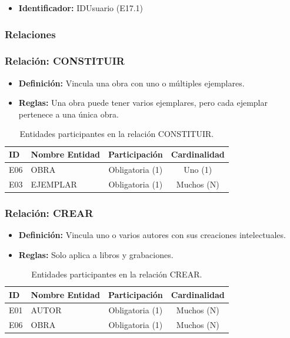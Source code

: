 	\begin{itemize}
		\item\textbf{Identificador:} IDUsuario (E17.1)
	\end{itemize}
	
	\subsubsection*{Relaciones}
	
	\subsubsection{Relación: CONSTITUIR}
	\begin{itemize}
		\item\textbf{Definición:} Vincula una obra con uno o múltiples ejemplares.
		\item\textbf{Reglas:} Una obra puede tener varios ejemplares, pero cada ejemplar pertenece a una única obra.
	\end{itemize}
	
	\begin{table}[H]
		\centering
		\caption{Entidades participantes en la relación CONSTITUIR.}
		\label{tab:rel_constituir}
		\small
		\begin{tabularx}{\textwidth}{X l c c}
			\toprule
			\textbf{ID} & \textbf{Nombre Entidad} & \textbf{Participación} & \textbf{Cardinalidad} \\
			\midrule
			E06 & OBRA & Obligatoria (1) & Uno (1) \\
			\addlinespace
			E03 & EJEMPLAR & Obligatoria (1) & Muchos (N) \\
			\bottomrule
		\end{tabularx}
	\end{table}
	
	\subsubsection{Relación: CREAR}
	\begin{itemize}
		\item\textbf{Definición:} Vincula uno o varios autores con sus creaciones intelectuales.
		\item\textbf{Reglas:} Solo aplica a libros y grabaciones.
	\end{itemize}
	
	\begin{table}[H]
		\centering
		\caption{Entidades participantes en la relación CREAR.}
		\label{tab:rel_crear}
		\small
		\begin{tabularx}{\textwidth}{X l c c}
			\toprule
			\textbf{ID} & \textbf{Nombre Entidad} & \textbf{Participación} & \textbf{Cardinalidad} \\
			\midrule
			E01 & AUTOR & Obligatoria (1) & Muchos (N) \\
			\addlinespace
			E06 & OBRA & Obligatoria (1) & Muchos (N) \\
			\bottomrule
		\end{tabularx}
	\end{table}
	
